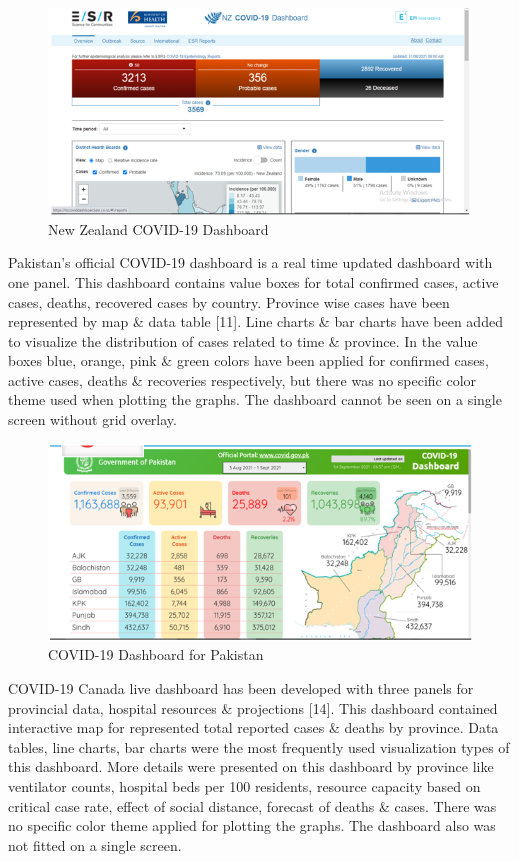 \documentclass[
]{article}
\begin{document}
\begin{figure}
\includegraphics[width=8.47in]{Images/6} \caption{New Zealand COVID-19 Dashboard}\label{fig:unnamed-chunk-6}
\end{figure}

Pakistan's official COVID-19 dashboard is a real time updated dashboard
with one panel. This dashboard contains value boxes for total confirmed
cases, active cases, deaths, recovered cases by country. Province wise
cases have been represented by map \& data table {[}11{]}. Line charts
\& bar charts have been added to visualize the distribution of cases
related to time \& province. In the value boxes blue, orange, pink \&
green colors have been applied for confirmed cases, active cases, deaths
\& recoveries respectively, but there was no specific color theme used
when plotting the graphs. The dashboard cannot be seen on a single
screen without grid overlay.

\begin{figure}
\includegraphics[width=8.33in]{Images/7} \caption{COVID-19 Dashboard for Pakistan}\label{fig:unnamed-chunk-7}
\end{figure}

COVID-19 Canada live dashboard has been developed with three panels for
provincial data, hospital resources \& projections {[}14{]}. This
dashboard contained interactive map for represented total reported cases
\& deaths by province. Data tables, line charts, bar charts were the
most frequently used visualization types of this dashboard. More details
were presented on this dashboard by province like ventilator counts,
hospital beds per 100 residents, resource capacity based on critical
case rate, effect of social distance, forecast of deaths \& cases. There
was no specific color theme applied for plotting the graphs. The
dashboard also was not fitted on a single screen.
\end{document}
